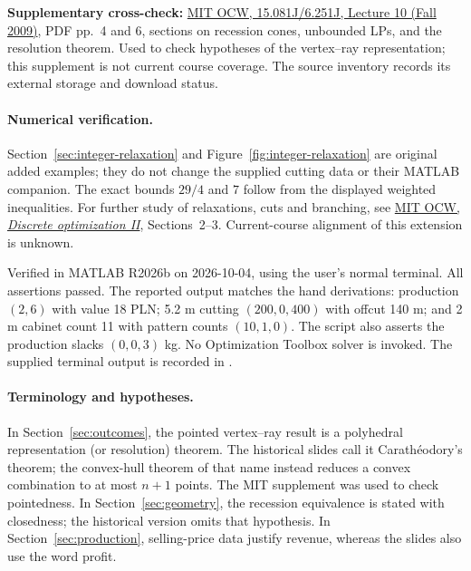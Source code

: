 \documentclass[11pt,a4paper]{article}
\begin{document}
\textbf{Supplementary cross-check:}
\href{https://ocw.mit.edu/courses/6-251j-introduction-to-mathematical-programming-fall-2009/ab890d20b071105239fe0b9bcf599f57_MIT6_251JF09_lec10.pdf}{MIT OCW, 15.081J/6.251J, Lecture 10 (Fall 2009)},
PDF pp.~4 and 6, sections on recession cones, unbounded LPs, and the resolution
theorem. Used to check hypotheses of the vertex--ray representation;
this supplement is not current course coverage. The source inventory records its external storage and download status.
\paragraph{Numerical verification.}
Section~\ref{sec:integer-relaxation} and Figure~\ref{fig:integer-relaxation}
are original added examples; they do not change the supplied cutting data or
their MATLAB companion. The exact bounds $29/4$ and $7$ follow from the displayed
weighted inequalities. For further study of relaxations, cuts and branching, see
\href{https://ocw.mit.edu/courses/6-251j-introduction-to-mathematical-programming-fall-2009/d0be6aa7393f489a419add7cec874a4c_MIT6_251JF09_lec25.pdf}{MIT OCW,
  \emph{Discrete optimization II}}, Sections~2--3. Current-course alignment
of this extension is unknown.

Verified in MATLAB R2026b on 2026-10-04, using the user's normal terminal. All assertions passed.
The reported output matches the hand derivations: production $(2,6)$ with value
18 PLN; 5.2 m cutting $(200,0,400)$ with offcut 140 m; and 2 m cabinet count 11
with pattern counts $(10,1,0)$. The script also asserts the production slacks
$(0,0,3)$ kg. No Optimization Toolbox solver is invoked.
The supplied terminal output is recorded in .

\paragraph{Terminology and hypotheses.}
In Section~\ref{sec:outcomes}, the pointed vertex--ray result is a polyhedral
representation (or resolution) theorem. The historical slides call it
Carath\'eodory's theorem; the convex-hull theorem of that name instead reduces
a convex combination to at most $n+1$ points. The MIT supplement was used to
check pointedness. In Section~\ref{sec:geometry}, the recession equivalence
is stated with closedness; the historical version omits that hypothesis.
In Section~\ref{sec:production}, selling-price data justify revenue, whereas
the slides also use the word profit.
\end{document}
